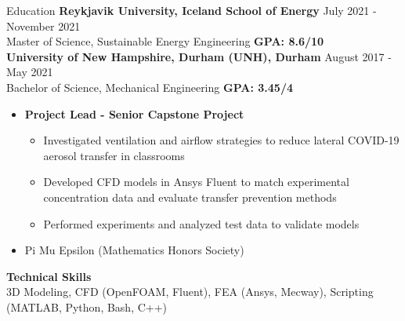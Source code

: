 \documentclass{resume}
\begin{document}
\begin{rSection}{Education}
    {\bf Reykjavik University, Iceland School of Energy} \hfill {July 2021 - November 2021}
    \\ {Master of Science, Sustainable Energy Engineering} \hfill {\bf{GPA: 8.6/10}}
    \\ {\bf University of New Hampshire, Durham (UNH), Durham} \hfill {August 2017 - May 2021}
    \\ {Bachelor of Science, Mechanical Engineering} \hfill {\bf GPA: 3.45/4}
    \vspace{-0.5em}
    \begin{itemize}[label={\tiny\raisebox{1ex}{\textbullet}}, noitemsep]
        \item {\bf{Project Lead - Senior Capstone Project}}
              \begin{itemize}[label={\tiny\raisebox{1ex}{\textbullet}}, noitemsep]
                  \item Investigated ventilation and airflow strategies to reduce lateral COVID-19 aerosol transfer in classrooms
                  \item Developed CFD models in Ansys Fluent to match experimental concentration data and evaluate transfer prevention methods
                  \item Performed experiments and analyzed test data to validate models
              \end{itemize}
        \item Pi Mu Epsilon (Mathematics Honors Society)
    \end{itemize}{}
    \vspace{-0.4em}
    {\bf Technical Skills}
    \\ 3D Modeling, CFD (OpenFOAM, Fluent), FEA (Ansys, Mecway), Scripting (MATLAB, Python, Bash, C++)

    \vspace{-0.4em}
\end{rSection}
\end{document}

